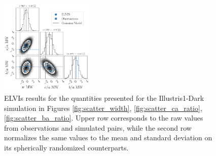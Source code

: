 \documentclass[a4paper,fleqn,usenatbib]{mnras}
\begin{document}
\begin{figure}
\includegraphics[width=0.40\textwidth]{gaussian_model_elvis_MW_n_12.pdf}
\caption{ELVIs results for the quantities presented for the Illustris1-Dark
  simulation in Figures  \ref{fig:scatter_width},
  \ref{fig:scatter_ca_ratio}, \ref{fig:scatter_ba_ratio}.
Upper row corresponds to the raw values from observations and
simulated pairs, while the second row normalizes the same values to
the mean and standard deviation on its spherically randomized
counterparts. 
\label{fig:scatter_elvis}}
\end{figure}
\end{document}
